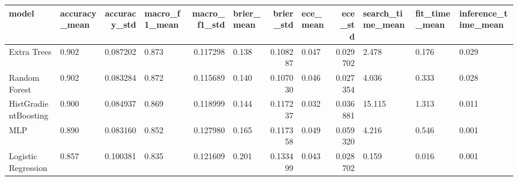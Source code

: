 \begin{tabular}{llrlrlrlrlll}
\toprule
model & accuracy_mean & accuracy_std & macro_f1_mean & macro_f1_std & brier_mean & brier_std & ece_mean & ece_std & search_time_mean & fit_time_mean & inference_time_mean \\
\midrule
Extra Trees & 0.902 & 0.087202 & 0.873 & 0.117298 & 0.138 & 0.108287 & 0.047 & 0.029702 & 2.478 & 0.176 & 0.029 \\
Random Forest & 0.902 & 0.083284 & 0.872 & 0.115689 & 0.140 & 0.107030 & 0.046 & 0.027354 & 4.036 & 0.333 & 0.028 \\
HistGradientBoosting & 0.900 & 0.084937 & 0.869 & 0.118999 & 0.144 & 0.117237 & 0.032 & 0.036881 & 15.115 & 1.313 & 0.011 \\
MLP & 0.890 & 0.083160 & 0.852 & 0.127980 & 0.165 & 0.117358 & 0.049 & 0.059320 & 4.216 & 0.546 & 0.001 \\
Logistic Regression & 0.857 & 0.100381 & 0.835 & 0.121609 & 0.201 & 0.133499 & 0.043 & 0.028702 & 0.159 & 0.016 & 0.001 \\
\bottomrule
\end{tabular}
